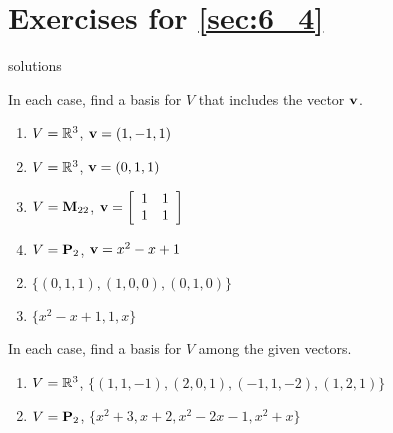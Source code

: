 \section*{Exercises for \ref{sec:6_4}}

\begin{Filesave}{solutions}
\end{Filesave}

\begin{multicols}{2}
\begin{ex}
In each case, find a basis for $V$ that includes the vector $\textbf{v}$.

\begin{enumerate}[label={\alph*.}]
\item $V = \mathbb{R}^3$, $\textbf{v} = (1, -1, 1)$

\item $V = \mathbb{R}^3$, $\textbf{v} = (0, 1, 1)$

\item $V = \textbf{M}_{22}$, $\textbf{v} =
\left[ \begin{array}{rr}
1 & 1 \\
1 & 1
\end{array} \right]$

\item $V = \textbf{P}_{2}$, $\textbf{v} = x^{2} - x + 1$

\end{enumerate}
\begin{sol}
\begin{enumerate}[label={\alph*.}]
\setcounter{enumi}{1}
\item  $\{(0, 1, 1), (1, 0, 0), (0, 1, 0)\}$

\setcounter{enumi}{3}
\item  $\{x^{2} - x + 1, 1, x\}$

\end{enumerate}
\end{sol}
\end{ex}

\begin{ex}
In each case, find a basis for $V$ among the given vectors.

\begin{enumerate}[label={\alph*.}]
\item $V = \mathbb{R}^3$, \newline $\{(1, 1, -1), (2, 0, 1), (-1, 1, -2), (1, 2, 1)\}$

\item $V = \textbf{P}_{2}$, $\{x^{2} + 3, x + 2, x^{2} - 2x -1, x^{2} + x\}$


\end{enumerate}
\end{ex}
\end{multicols}
